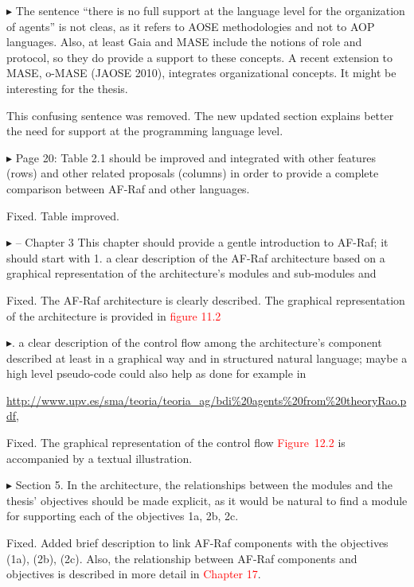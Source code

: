 \documentclass{article}
\newcommand*\R[1]{\textcolor{red}{#1}} %
\newenvironment{them}%
  {\bigskip\noindent\begingroup\color{blue}$\blacktriangleright$\enspace}%
  {\endgroup\par}
\begin{document}
\begin{them}
The sentence ``there is no full support at the language level for the
organization of agents'' is not cleas, as it refers to AOSE methodologies and
not to AOP languages. Also, at least Gaia and MASE include the notions of role
and protocol, so they do provide a support to these concepts. A recent
extension to MASE, o-MASE (JAOSE 2010), integrates organizational concepts. It
might be interesting for the thesis.
\end{them}
This confusing sentence was removed. The new updated section explains better
the need for support at the programming language level. 

\begin{them}
Page 20:
Table 2.1 should be improved and integrated with other features (rows) and
other related proposals (columns) in order to provide a complete comparison
between AF-Raf and other languages.
\end{them}
Fixed. Table improved.

\begin{them}
-- Chapter 3
This chapter should provide a gentle introduction to AF-Raf; it should start
with 1. a clear description of the AF-Raf architecture based on a graphical
representation of the architecture's modules and sub-modules and
\end{them}
Fixed. The AF-Raf architecture is clearly described. The graphical
representation of the architecture is provided in \R{figure 11.2}

\begin{them}
2. a clear description of the control flow among the architecture's component
described at least in a graphical way and in structured natural language; maybe
a high level pseudo-code could also help as done for example in

\url{http://www.upv.es/sma/teoria/teoria_ag/bdi\%20agents\%20from\%20theoryRao.pdf},
\end{them}
Fixed. The graphical representation of the control flow \R{Figure~12.2} is
accompanied by a textual illustration.

\begin{them}
Section 5.
In the architecture, the relationships between the modules and the thesis'
objectives should be made explicit, as it would be natural to find a module for
supporting each of the objectives 1a, 2b, 2c.
\end{them}
Fixed. Added brief description to link AF-Raf components with the objectives
(1a), (2b), (2c). Also, the relationship between AF-Raf components and
objectives is described in  more detail in \R{Chapter 17}.
\end{document}
